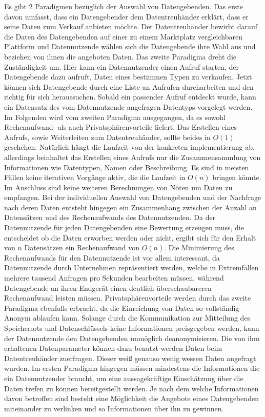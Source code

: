 \documentclass{scrreprt}
\begin{document}
Es gibt 2 Paradigmen bezüglich der Auswahl von Datengebenden. Das erste davon umfasst, dass ein Datengebender dem Datentreuhänder erklärt, dass er seine Daten zum Verkauf anbieten möchte. Der Datentreuhänder bewirbt darauf die Daten des Datengebenden auf einer zu einem Marktplatz vergleichbaren Plattform und Datennutzende wählen sich die Datengebende ihre Wahl aus und beziehen von ihnen die angeboten Daten. Das zweite Paradigma dreht die Zuständigkeit um. Hier kann ein Datennutzender einen Aufruf starten, der Datengebende dazu aufruft, Daten eines bestimmen Typen zu verkaufen. Jetzt können sich Datengebende durch eine Liste an Aufrufen durcharbeiten und den richtig für sich heraussuchen. Sobald ein passender Aufruf entdeckt wurde, kann ein Datensatz des vom Datennutzende angefragen Datentyps vorgelegt werden. 
Im Folgenden wird vom zweiten Paradigma ausgegangen, da es sowohl Rechenaufwand- als auch Privatsphärenvorteile liefert. Das Erstellen eines Aufrufs, sowie Weiterleiten zum Datentreuhänder, sollte beides in $O(1)$ geschehen. Natürlich hängt die Laufzeit von der konkreten implementierung ab, allerdings beinhaltet das Erstellen eines Aufrufs nur die Zusammensammlung von Informationen wie Datentypen, Namen oder Beschreibung. Es sind in meisten Fällen keine iterativen Vorgänge aktiv, die die Laufzeit in $O(n)$ bringen könnte. Im Anschluss sind keine weiteren Berechnungen von Nöten um Daten zu empfangen. Bei der individuellen Auswahl von Datengebenden und der Nachfrage nach deren Daten entsteht hingegen ein Zusammenhang zwischen der Anzahl an Datensätzen und des Rechenaufwands des Datennutzenden. Da der Datennutzende für jeden Datengebenden eine Bewertung erzeugen muss, die entscheidet ob die Daten erworben werden oder nicht, ergibt sich für den Erhalt von $n$ Datensätzen ein Rechenaufwand von $O(n)$. Die Minimierung des Rechenaufwands für den Datennutzende ist vor allem interessant, da Datennutzende durch Unternehmen repräsentiert werden, welche in Extremfällen mehrere tausend Anfragen pro Sekunden bearbeiten müssen, während Datengebende an ihren Endgerät einen deutlich überschaubareren Rechenaufwand leisten müssen.
Privatsphärenvorteile werden durch das zweite Paradigma ebenfalls erbracht, da die Einreichung von Daten so vollständig Anonym ablaufen kann. Solange durch die Kommunikation zur Mitteilung des Speicherorts und Datenschlüssels keine Informationen preisgegeben werden, kann der Datennutzende den Datengebenden unmöglich deanonymisieren. Die von ihm erhaltenen Datenparameter können dazu benutzt werden Daten beim Datentreuhänder zuerfragen. Dieser weiß genauso wenig wessen Daten angefragt wurden. Im ersten Paradigma hingegen müssen mindestens die Informationen die ein Datennutzender braucht, um eine aussagekräftige Einschätzung über die Daten trefen zu können bereitgestellt werden. Je nach dem welche Informationen davon betroffen sind besteht eine Möglichkeit die Angebote eines Datengebenden miteinander zu verlinken und so Informationen über ihn zu gewinnen.
\end{document}
